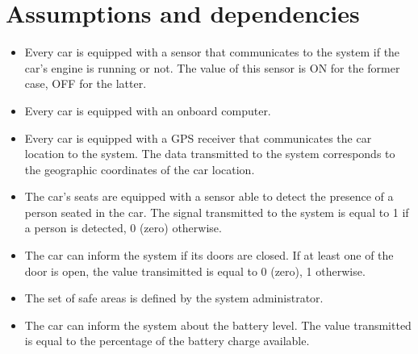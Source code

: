 \section{Assumptions and dependencies}

\begin{itemize}
	\item Every car is equipped with a sensor that communicates to the system if the car's engine is running or not. The value of this sensor is ON for the former case, OFF for the latter.
	\item Every car is equipped with an onboard computer.
	\item Every car is equipped with a GPS receiver that communicates the car location to the system. The data transmitted to the system corresponds to the geographic coordinates of the car location.
	\item The car's seats are equipped with a sensor able to detect the presence of a person seated in the car. The signal transmitted to the system is equal to 1 if a person is detected, 0 (zero) otherwise.
	\item The car can inform the system if its doors are closed. If at least one of the door is open, the value transimitted is equal to 0 (zero), 1 otherwise.
	\item The set of safe areas is defined by the system administrator.
	\item The car can inform the system about the battery level. The value transmitted is equal to the percentage of the battery charge available.
\end{itemize}